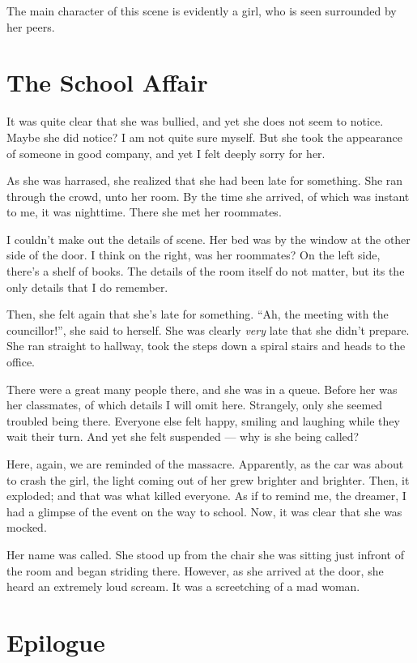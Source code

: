 \documentclass[a4paper,10pt]{article}
\begin{document}
The main character of this scene is evidently a girl, who is seen surrounded by her peers.

\section{The School Affair}

It was quite clear that she was bullied, and yet she does not seem to notice.
Maybe she did notice?
I am not quite sure myself.
But she took the appearance of someone in good company, and yet I felt deeply sorry for her.

As she was harrased, she realized that she had been late for something.
She ran through the crowd, unto her room.
By the time she arrived, of which was instant to me, it was nighttime.
There she met her roommates.

I couldn't make out the details of scene.
Her bed was by the window at the other side of the door.
I think on the right, was her roommates?
On the left side, there's a shelf of books.
The details of the room itself do not matter, but its the only details that I do remember.

Then, she felt again that she's late for something.
``Ah, the meeting with the councillor!'', she said to herself.
She was clearly \textit{very} late that she didn't prepare.
She ran straight to hallway, took the steps down a spiral stairs and heads to the office.

There were a great many people there, and she was in a queue.
Before her was her classmates, of which details I will omit here.
Strangely, only she seemed troubled being there.
Everyone else felt happy, smiling and laughing while they wait their turn.
And yet she felt suspended --- why is she being called?

Here, again, we are reminded of the massacre.
Apparently, as the car was about to crash the girl, the light coming out of her grew brighter and brighter.
Then, it exploded; and that was what killed everyone.
As if to remind me, the dreamer, I had a glimpse of the event on the way to school.
Now, it was clear that she was mocked.

Her name was called.
She stood up from the chair she was sitting just infront of the room and began striding there.
However, as she arrived at the door, she heard an extremely loud scream.
It was a screetching of a mad woman.

\section{Epilogue}
\end{document}
